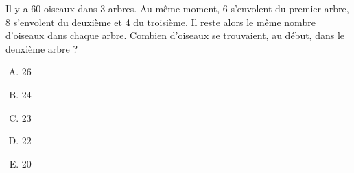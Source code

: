 Il y a 60 oiseaux dans 3 arbres. Au même moment, 6 s'envolent du premier arbre, 8 s'envolent
du deuxième et 4 du troisième. Il reste alors le même nombre d'oiseaux
dans chaque arbre. Combien d'oiseaux se trouvaient, au début, dans le
deuxième arbre ?
\begin{multicols}{5}
  \begin{enumerate}[A)]
  \item 26
  \item 24
  \item 23
  \item 22
  \item 20
  \end{enumerate}
\end{multicols}